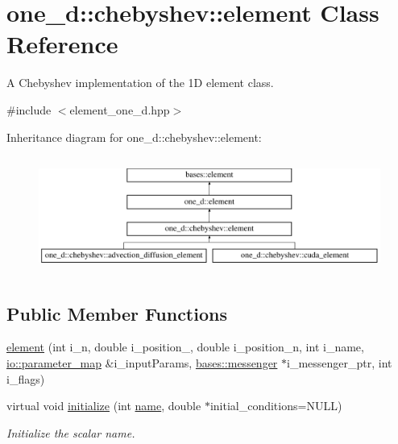 \hypertarget{classone__d_1_1chebyshev_1_1element}{\section{one\-\_\-d\-:\-:chebyshev\-:\-:element Class Reference}
\label{classone__d_1_1chebyshev_1_1element}
}


A Chebyshev implementation of the 1\-D element class.  




{\ttfamily \#include $<$element\-\_\-one\-\_\-d.\-hpp$>$}

Inheritance diagram for one\-\_\-d\-:\-:chebyshev\-:\-:element\-:\begin{figure}[H]
\begin{center}
\leavevmode
\includegraphics[height=3.875432cm]{classone__d_1_1chebyshev_1_1element}
\end{center}
\end{figure}
\subsection*{Public Member Functions}
\begin{DoxyCompactItemize}
\item 
\hyperlink{classone__d_1_1chebyshev_1_1element_a28bb81f135c419b854354ba966a532af}{element} (int i\-\_\-n, double i\-\_\-position\-\_, double i\-\_\-position\-\_\-n, int i\-\_\-name, \hyperlink{namespaceio_a1c55c654666eeece6a9724f453fdbd87}{io\-::parameter\-\_\-map} \&i\-\_\-input\-Params, \hyperlink{classbases_1_1messenger}{bases\-::messenger} $\ast$i\-\_\-messenger\-\_\-ptr, int i\-\_\-flags)
\begin{DoxyCompactList}\small\item\em \end{DoxyCompactList}\item 
virtual void \hyperlink{classone__d_1_1chebyshev_1_1element_a9af801e1cdc7ccfb79500ba7efad4359}{initialize} (int \hyperlink{classbases_1_1element_a52af85c34174ec732a3feb6a7e63fbc6}{name}, double $\ast$initial\-\_\-conditions=N\-U\-L\-L)
\begin{DoxyCompactList}\small\item\em Initialize the scalar name. \end{DoxyCompactList}\end{DoxyCompactItemize}
